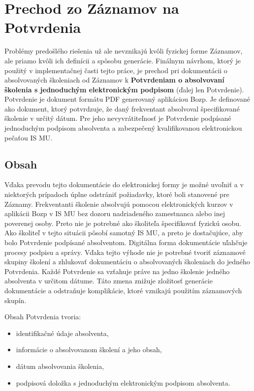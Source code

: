\documentclass[
  digital,     %
  oneside,     %
  nosansbold,  %
  nocolorbold, %
  lof,         %
  nolot,         %
]{fithesis4}
\begin{document}
\section{Prechod zo Záznamov na Potvrdenia}
Problémy predošlého riešenia už ale nevznikajú kvôli fyzickej forme Záznamov, ale priamo kvôli ich definícii a spôsobu generácie. Finálnym návrhom, ktorý je použitý v implementačnej časti tejto práce, je prechod pri dokumentácii o absolvovaných školeniach od Záznamov k \textbf{Potvrdeniam o absolvovaní školenia s jednoduchým elektronickým podpisom} (ďalej len Potvrdenie). Potvrdenie je dokument formátu PDF generovaný aplikáciou Bozp. Je definované ako dokument, ktorý potvrdzuje, že daný frekventant absolvoval špecifikované školenie v určitý dátum. Pre jeho nevyvrátiteľnosť je Potvrdenie podpísané jednoduchým podpisom absolventa a zabezpečený kvalifikovanou elektronickou pečaťou IS MU.

\subsection*{Obsah}
Vďaka prevodu tejto dokumentácie do elektronickej formy je možné uvoľniť a v niektorých prípadoch úplne odstrániť požiadavky, ktoré boli stanovené pre Záznamy. 
Frekventanti školenie absolvujú pomocou elektronických kurzov v aplikácii Bozp v IS MU bez dozoru nadriadeného zamestnanca alebo inej poverenej osoby. Preto nie je potrebné ako školiteľa špecifikovať fyzickú osobu. Ako školiteľ v tejto situácii pôsobí samotný IS MU, a preto je dostačujúce, aby bolo Potvrdenie podpísané absolventom.
Digitálna forma dokumentácie uľahčuje procesy podpisu a správy. Vďaka tejto výhode nie je potrebné tvoriť záznamové skupiny školení a zhlukovať dokumentáciu o absolvovaných školeniach do jedného Potvrdenia. Každé Potvrdenie sa vzťahuje práve na jedno školenie jedného absolventa v určitom dátume. Táto zmena znižuje zložitosť generácie dokumentácie a odstraňuje komplikácie, ktoré vznikajú použitím záznamových skupín.

Obsah Potvrdenia tvoria:

\begin{itemize}
  \item identifikačné údaje absolventa,
  \item informácie o absolvovanom školení a jeho obsah,
  \item dátum absolvovania školenia,
  \item podpisová doložka s jednoduchým elektronickým podpisom absolventa.
\end{itemize}
\end{document}
